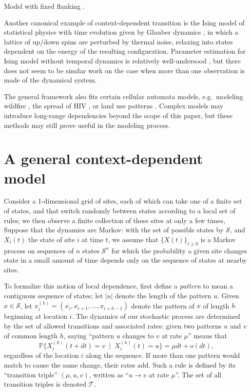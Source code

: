 \documentclass{article}
\renewcommand{\P}{\mathbb{P}}
\newcommand{\calS}{\mathcal{S}}  %
\newcommand{\calT}{\mathcal{T}}  %
\newcommand{\given}{\;\mid\;}
\theoremstyle{plain}
\theoremstyle{definition}
\begin{document}
Model with fixed flanking \citet{saunders2007insights}.

Another canonical example of context-dependent transition is the Ising model of statistical physics
with time evolution given by Glauber dynamics \citep{glauber1963timedependent},
in which a lattice of up/down spins are perturbed by thermal noise,
relaxing into states dependent on the energy of the resulting configuration.
Parameter estimation for Ising model without temporal dynamics
is relatively well-undersood \citep{pickard1982inference,frigessi1990parameter},
but there does not seem to be similar work on the case when more than one observation is made of the dynamical system.

The general framework also fits certain cellular automata models,
e.g.\ modeling wildfire \citep{clarke1994cellular},
the spread of HIV \citep{zorzenondossantos2001dynamics},
or land use patterns \citep{wu2002calibration}.
Complex models may introduce long-range dependencies beyond the scope of this paper,
but these methods may still prove useful in the modeling process.




\section{A general context-dependent model}

Consider a 1-dimensional grid of sites, each of which can take one of a finite set of states,
and that switch randomly between states according to a local set of rules;
we then observe a finite collection of these sites at only a few times,
Suppose that the dynamics are Markov:
with the set of possible states by $\calS$,
and $X_i(t)$ the state of site $i$ at time $t$,
we assume that $\{X(t)\}_{t \ge 0}$ is a Markov process on sequences of $n$ states $\calS^n$
for which the probability a given site changes state in a small amount of time
depends only on the sequence of states at nearby sites.

To formalize this notion of local dependence,
first define a \textit{pattern} to mean a contiguous sequence of states;
let $|u|$ denote the length of the pattern $u$.
Given $x \in \calS$,
let $x_i^{(h)} = (x_i, x_{i+1}, \ldots, x_{i+h-1})$ denote the pattern of $x$ of length $h$ beginning at location $i$.
The dynamics of our stochastic process are determined by the set of allowed transitions and associated rates:
given two patterns $u$ and $v$ of common length $h$,
saying ``pattern $u$ changes to $v$ at rate $\mu$'' means that
\[
    \P\{ X_i^{(h)}(t+dt) = v \given X_i^{(h)}(t) = u \} = \mu dt + o(dt),
\]
regardless of the location $i$ along the sequence.
If more than one pattern would match to cause the same change, their rates add.
Such a rule is defined by its ``transition triple'' $(\mu,u,v)$,
written as ``$u \to v$ at rate $\mu$''.
The set of all transition triples is denoted $\calT$.
\end{document}
